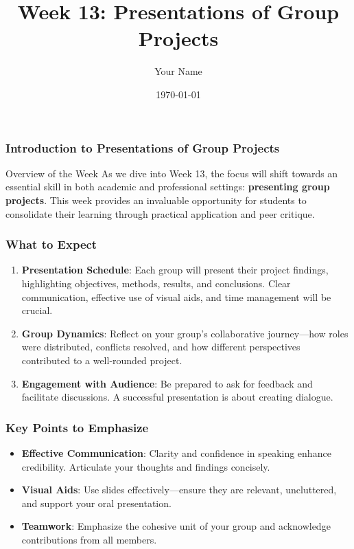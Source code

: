 \documentclass{beamer}
\title{Week 13: Presentations of Group Projects}
\author{Your Name}
\institute{Your Institution}
\date{\today}
\begin{document}
\frame{\titlepage}

\begin{frame}[fragile]
    \frametitle{Introduction to Presentations of Group Projects}
    \begin{block}{Overview of the Week}
        As we dive into Week 13, the focus will shift towards an essential skill in both academic and professional settings: \textbf{presenting group projects}. This week provides an invaluable opportunity for students to consolidate their learning through practical application and peer critique.
    \end{block}
\end{frame}

\begin{frame}[fragile]
    \frametitle{What to Expect}
    \begin{enumerate}
        \item \textbf{Presentation Schedule}: Each group will present their project findings, highlighting objectives, methods, results, and conclusions. Clear communication, effective use of visual aids, and time management will be crucial.
        
        \item \textbf{Group Dynamics}: Reflect on your group’s collaborative journey—how roles were distributed, conflicts resolved, and how different perspectives contributed to a well-rounded project.
        
        \item \textbf{Engagement with Audience}: Be prepared to ask for feedback and facilitate discussions. A successful presentation is about creating dialogue.
    \end{enumerate}
\end{frame}

\begin{frame}[fragile]
    \frametitle{Key Points to Emphasize}
    \begin{itemize}
        \item \textbf{Effective Communication}: Clarity and confidence in speaking enhance credibility. Articulate your thoughts and findings concisely.
        
        \item \textbf{Visual Aids}: Use slides effectively—ensure they are relevant, uncluttered, and support your oral presentation.
        
        \item \textbf{Teamwork}: Emphasize the cohesive unit of your group and acknowledge contributions from all members.
    \end{itemize}
\end{frame}
\end{document}
